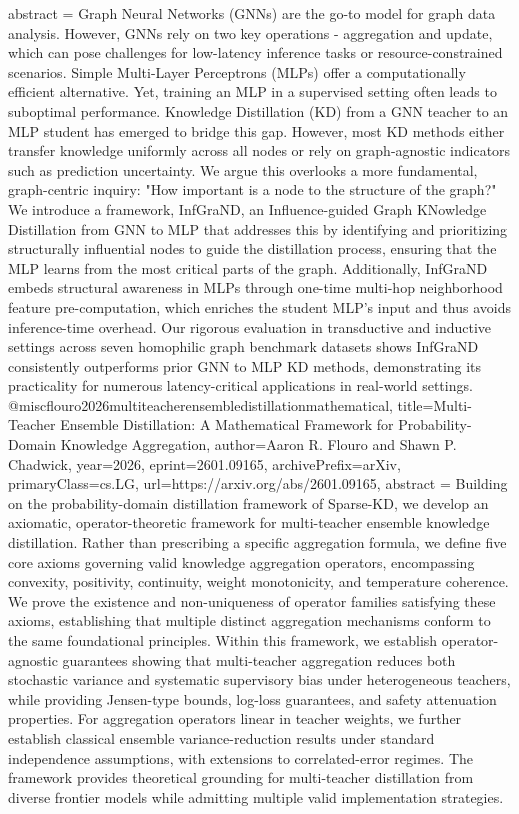 {      abstract = {Graph Neural Networks (GNNs) are the go-to model for graph data analysis. However, GNNs rely on two key operations - aggregation and update, which can pose challenges for low-latency inference tasks or resource-constrained scenarios. Simple Multi-Layer Perceptrons (MLPs) offer a computationally efficient alternative. Yet, training an MLP in a supervised setting often leads to suboptimal performance. Knowledge Distillation (KD) from a GNN teacher to an MLP student has emerged to bridge this gap. However, most KD methods either transfer knowledge uniformly across all nodes or rely on graph-agnostic indicators such as prediction uncertainty. We argue this overlooks a more fundamental, graph-centric inquiry: "How important is a node to the structure of the graph?" We introduce a framework, InfGraND, an Influence-guided Graph KNowledge Distillation from GNN to MLP that addresses this by identifying and prioritizing structurally influential nodes to guide the distillation process, ensuring that the MLP learns from the most critical parts of the graph. Additionally, InfGraND embeds structural awareness in MLPs through one-time multi-hop neighborhood feature pre-computation, which enriches the student MLP's input and thus avoids inference-time overhead. Our rigorous evaluation in transductive and inductive settings across seven homophilic graph benchmark datasets shows InfGraND consistently outperforms prior GNN to MLP KD methods, demonstrating its practicality for numerous latency-critical applications in real-world settings.}
}@misc{flouro2026multiteacherensembledistillationmathematical,
      title={Multi-Teacher Ensemble Distillation: A Mathematical Framework for Probability-Domain Knowledge Aggregation}, 
      author={Aaron R. Flouro and Shawn P. Chadwick},
      year={2026},
      eprint={2601.09165},
      archivePrefix={arXiv},
      primaryClass={cs.LG},
      url={https://arxiv.org/abs/2601.09165},
      abstract = {Building on the probability-domain distillation framework of Sparse-KD, we develop an axiomatic, operator-theoretic framework for multi-teacher ensemble knowledge distillation. Rather than prescribing a specific aggregation formula, we define five core axioms governing valid knowledge aggregation operators, encompassing convexity, positivity, continuity, weight monotonicity, and temperature coherence. We prove the existence and non-uniqueness of operator families satisfying these axioms, establishing that multiple distinct aggregation mechanisms conform to the same foundational principles.   Within this framework, we establish operator-agnostic guarantees showing that multi-teacher aggregation reduces both stochastic variance and systematic supervisory bias under heterogeneous teachers, while providing Jensen-type bounds, log-loss guarantees, and safety attenuation properties. For aggregation operators linear in teacher weights, we further establish classical ensemble variance-reduction results under standard independence assumptions, with extensions to correlated-error regimes. The framework provides theoretical grounding for multi-teacher distillation from diverse frontier models while admitting multiple valid implementation strategies.}
}
